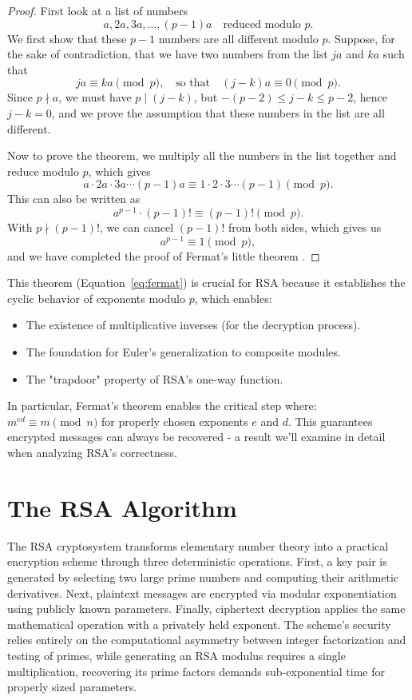 \documentclass[11pt,a4paper]{article}
\numberwithin{equation}{section}
\begin{document}
\begin{proof}
First look at a list of numbers
\[ a, 2a, 3a, \ldots, (p-1)a \quad \text{reduced modulo } p. \]
We first show that these $p-1$ numbers are all different modulo $p$. Suppose, for the sake of contradiction, that we have two numbers from the list $ja$ and $ka$ such that
\[ ja \equiv ka \pmod{p}, \quad \text{so that} \quad (j-k)a \equiv 0 \pmod{p}. \]
Since $p \nmid a$, we must have $p \mid (j-k)$, but $-(p-2) \leq j-k \leq p-2$, hence $j-k = 0$, and we prove the assumption that these numbers in the list are all different.

\noindent Now to prove the theorem, we multiply all the numbers in the list together and reduce modulo $p$, which gives
\[ a \cdot 2a \cdot 3a \cdots (p-1)a \equiv 1 \cdot 2 \cdot 3 \cdots (p-1) \pmod{p}. \]
This can also be written as
\[ a^{p-1} \cdot (p-1)! \equiv (p-1)! \pmod{p}. \]
With $p \nmid (p-1)!$, we can cancel $(p-1)!$ from both sides, which gives us
\[ a^{p-1} \equiv 1 \pmod{p}, \]
and we have completed the proof of Fermat's little theorem \cite{honglin}.
\end{proof}
\noindent This theorem (Equation~\ref{eq:fermat}) is crucial for RSA because it establishes the cyclic behavior of exponents modulo $p$, which enables:
\begin{itemize}
    \item The existence of multiplicative inverses (for the decryption process).
    \item The foundation for Euler's generalization to composite modules.
    \item The "trapdoor" property of RSA's one-way function.
\end{itemize}
In particular, Fermat's theorem enables the critical step where: $m^{ed} \equiv m \pmod{n}$ for properly chosen exponents $e$ and $d$. This guarantees encrypted messages can always be recovered - a result we'll examine in detail when analyzing RSA's correctness.

\newpage 

\section{The RSA Algorithm}
\hspace{0.5cm} The RSA cryptosystem transforms elementary number theory into a practical encryption scheme through three deterministic operations. First, a key pair is generated by selecting two large prime numbers and computing their arithmetic derivatives. Next, plaintext messages are encrypted via modular exponentiation using publicly known parameters. Finally, ciphertext decryption applies the same mathematical operation with a privately held exponent. The scheme's security relies entirely on the computational asymmetry between integer factorization and testing of primes, while generating an RSA modulus requires a single multiplication, recovering its prime factors demands sub-exponential time for properly sized parameters.
\\
\end{document}
